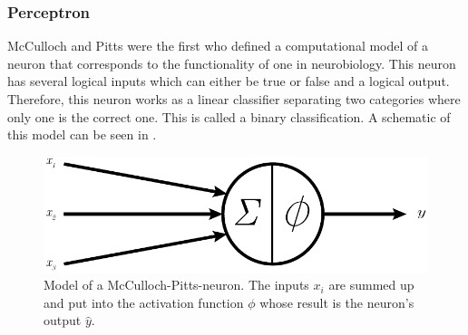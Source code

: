 \subsubsection{Perceptron}
\label{sec:mlp-theorie}
McCulloch and Pitts \cite{McCulloch1988} were the first who defined a computational model of a neuron that corresponds to the functionality of one in neurobiology.
This neuron has several logical inputs which can either be true or false and a logical output.
Therefore, this neuron works as a linear classifier separating two categories where only one is the correct one.
This is called a binary classification.
A schematic of this model can be seen in .
\begin{figure}
	\centering
	\includegraphics{images/neuron.pdf}
	\caption[Model of a McCulloch-Pitts-neuron]{Model of a McCulloch-Pitts-neuron. The inputs $x_i$ are summed up and put into the activation function $\phi$ whose result is the neuron's output $\hat{y}$.}
	\label{fig:neuron}
\end{figure}

